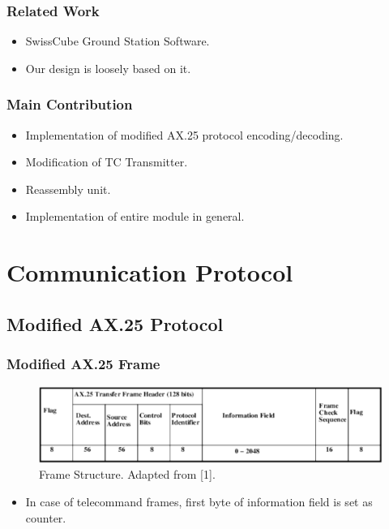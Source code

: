 \documentclass{beamer}
\begin{document}
\begin{frame}
\frametitle{Related Work}
\begin{itemize}
\item SwissCube Ground Station Software.
\item Our design is loosely based on it.

\end{itemize}
\end{frame}
\begin{frame}
\frametitle{Main Contribution}
\begin{itemize}


\item Implementation of modified AX.25 protocol encoding/decoding.
\item Modification of TC Transmitter.
\item Reassembly unit.
\item Implementation of entire module in general.
\end{itemize}
\end{frame}
\section{Communication Protocol}
\subsection{Modified AX.25 Protocol}
\begin{frame}
\frametitle{Modified AX.25 Frame}
\begin{figure}
\includegraphics[scale = 0.5 ]{ax25main.pdf}
\caption{Frame Structure. Adapted from [1].}
\label{fig1:ax25main}
\end{figure}
\begin{itemize}
\item In case of telecommand frames, first byte of information field is set as counter.
\end{itemize}
\end{frame}
\end{document}
